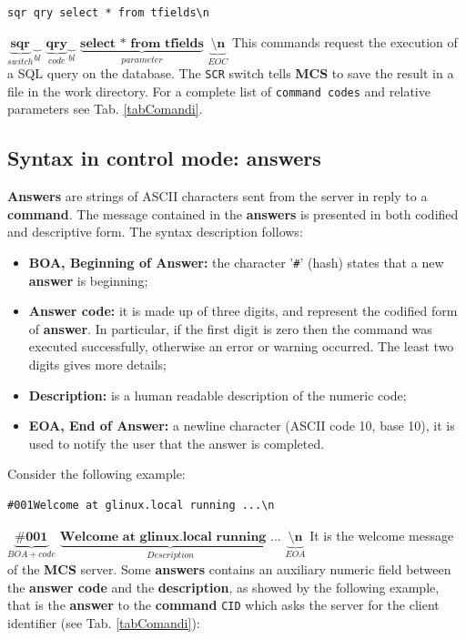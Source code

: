 \documentclass[12pt,titlepage]{book}
\newcommand{\mcs}{\textbf{MCS} }
\begin{document}
\bigskip
\verb|sqr qry select * from tfields\n|
\bigskip

$\underbrace{\textbf{sqr}}_{switch}\underbrace{\textbf{\ }}_{bl}$
$\underbrace{\textbf{qry}}_{code}\underbrace{\textbf{\ }}_{bl}$
$\underbrace{\textbf{select * from tfields}}_{parameter}$
$\underbrace{\textbf{\textbackslash n}}_{EOC}$
\bigskip \newline
%
This commands request the execution of a SQL query on the
database. The \verb|SCR| switch tells \mcs to save the result in
a file in the work directory. For a complete list of
\verb|command codes| and relative parameters see Tab.
\ref{tabComandi}.

\subsection{Syntax in control mode: answers}
\textbf{Answers} are strings of ASCII characters sent from the server
in reply to a \textbf{command}. The message contained in the
\textbf{answers} is presented in both codified and descriptive
form. The syntax description follows:
\begin{itemize}
\item \textbf{BOA, Beginning of Answer:} the character '\verb|#|'
  (hash) states that a new \textbf{answer} is beginning;
\item \textbf{Answer code:} it is made up of three digits, and
  represent the codified form of \textbf{answer}. In particular, if
  the first digit is zero then the command was executed successfully,
  otherwise an error or warning occurred. The least two digits gives
  more details;
\item \textbf{Description:} is a human readable description of the numeric code;
\item \textbf{EOA, End of Answer:} a newline character (ASCII code 10, base
  10), it is used to notify the user that the answer is completed.
\end{itemize}
%
Consider the following example:

\bigskip

\begin{verbatim}
#001Welcome at glinux.local running ...\n
\end{verbatim}
\bigskip

$\underbrace{\textbf{\#001}}_{BOA + code}$
$\underbrace{\textbf{Welcome at glinux.local running ...}}_{Description}$
$\underbrace{\textbf{\textbackslash n}}_{EOA}$
\bigskip \newline
%
It is the welcome message of the \mcs server. Some
\textbf{answers} contains an auxiliary numeric field between the
\textbf{answer code} and the \textbf{description}, as showed by the
following example, that is the \textbf{answer} to the \textbf{command}
\verb|CID| which asks the server for the client identifier (see
Tab. \ref{tabComandi}):
\end{document}

